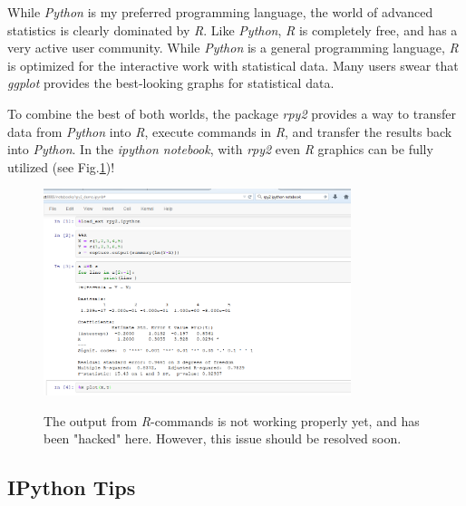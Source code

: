 While \emph{Python} is my preferred programming language, the world of advanced statistics is clearly dominated by \emph{R}. Like \emph{Python}, \emph{R} is completely free, and has a very active user community. While \emph{Python} is a general programming language, \emph{R} is optimized for the interactive work with statistical data. Many users swear that \emph{ggplot} provides the best-looking graphs for statistical data.

To combine the best of both worlds, the package \emph{rpy2} provides a way to transfer data from \emph{Python} into \emph{R}, execute commands in \emph{R}, and transfer the results back into \emph{Python}. In the \emph{ipython notebook}, with \emph{rpy2} even \emph{R} graphics can be fully utilized (see Fig.\ref{fig:rpy2})!

\begin{figure}
  \centering
  \includegraphics[width=0.8\textwidth]{../Images/ipython-rmagic.png}\\
  \caption{The output from \emph{R}-commands is not working properly yet, and has been "hacked" here. However, this issue should be resolved soon.}
  \label{fig:rpy2}
\end{figure}

\subsection{IPython Tips}

